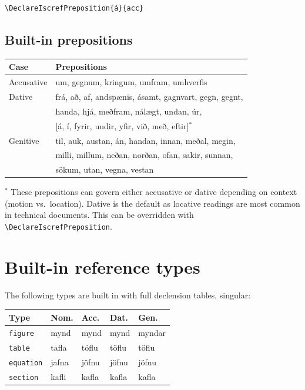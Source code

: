 \documentclass{article}
\begin{document}
\begin{lstlisting}
\DeclareIscrefPreposition{á}{acc}
\end{lstlisting}

\subsection{Built-in prepositions}

\begin{center}
\begin{tabular}{ll}
  \toprule
  Case & Prepositions \\
  \midrule
  Accusative & um, gegnum, kringum, umfram, umhverfis \\
  \midrule
  Dative & frá, að, af, andspænis, ásamt, gagnvart, gegn, gegnt, \\
         & handa, hjá, meðfram, nálægt, undan, úr, \\
         & [á, í, fyrir, undir, yfir, við, með, eftir]$^*$ \\
  \midrule
  Genitive & til, auk, austan, án, handan, innan, meðal, megin, \\
           & milli, millum, neðan, norðan, ofan, sakir, sunnan, \\
           & sökum, utan, vegna, vestan \\
  \bottomrule
\end{tabular}
\end{center}

\noindent$^*$ These prepositions can govern either accusative or dative
depending on context (motion vs.\ location). Dative is the default as
locative readings are most common in technical documents. This can be
overridden with \verb|\DeclareIscrefPreposition|.

\section{Built-in reference types}

The following types are built in with full declension tables, singular:

\begin{center}
\begin{tabular}{lllll}
  \toprule
  Type & Nom. & Acc. & Dat. & Gen. \\
  \midrule
  \texttt{figure}   & mynd  & mynd  & mynd  & myndar \\
  \texttt{table}    & tafla & töflu & töflu & töflu  \\
  \texttt{equation} & jafna & jöfnu & jöfnu & jöfnu  \\
  \texttt{section}  & kafli & kafla & kafla & kafla  \\
  \bottomrule
\end{tabular}
\end{center}
\end{document}
